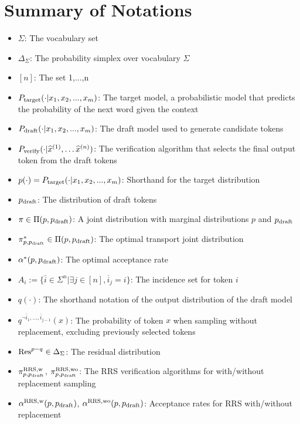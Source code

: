\documentclass{article}
\begin{document}
\section{Summary of Notations}
\begin{itemize}
\item $\Sigma$: The vocabulary set
\item $\Delta_\Sigma$: The probability simplex over vocabulary $\Sigma$
\item $[n]$: The set {1,...,n}
\item $P_{\operatorname{target}}(\cdot|x_1,x_2,...,x_m)$: The target model, a probabilistic model that predicts the probability of the next word given the context
\item $P_{\operatorname{draft}}(\cdot|x_1,x_2,...,x_m)$: The draft model used to generate candidate tokens
\item $P_{\operatorname{verify}}(\cdot|\widehat{x}^{(1)},\dots\widehat{x}^{(n)})$: The verification algorithm that selects the final output token from the draft tokens
\item $p(\cdot)=P_{\operatorname{target}}(\cdot|x_1,x_2,...,x_m)$: Shorthand for the target distribution
\item $p_{\operatorname{draft}}$: The distribution of draft tokens
\item $\pi\in\Pi(p,p_{\operatorname{draft}})$: A joint distribution with marginal distributions $p$ and $p_{\operatorname{draft}}$
\item $\pi^\ast_{p,p_{\operatorname{draft}}}\in\Pi(p,p_{\operatorname{draft}})$: The optimal transport joint distribution
\item $\alpha^\ast(p,p_{\operatorname{draft}})$: The optimal acceptance rate
\item $A_i:=\{\bar{i}\in \Sigma^n|\exists j\in[n], \overline{i}_j=i\}$: The incidence set for token $i$
\item $q(\cdot)$: The shorthand notation of the output distribution of the draft model
\item $q^{\neg \bar{i}_1,\dots,\bar{i}_{j-1}}(x)$: The probability of token $x$ when sampling without replacement, excluding previously selected tokens
\item $\operatorname{Res}^{p-q}\in \Delta_\Sigma$: The residual distribution
\item $\pi^{\operatorname{RRS},\operatorname{w}}_{p,p_{\operatorname{draft}}}$, $\pi^{\operatorname{RRS},\operatorname{wo}}_{p,p_{\operatorname{draft}}}$: The RRS verification algorithms for with/without replacement sampling
\item $\alpha^{\operatorname{RRS},\operatorname{w}}(p,p_{\operatorname{draft}})$, $\alpha^{\operatorname{RRS},\operatorname{wo}}(p,p_{\operatorname{draft}})$: Acceptance rates for RRS with/without replacement

\end{itemize}
\end{document}
